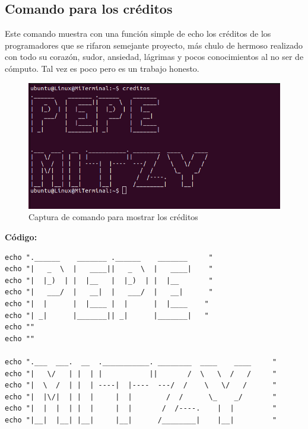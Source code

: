 \documentclass[12pt,a4paper]{article}
\begin{document}
\newpage
\subsection{Comando para los créditos}
\noindent Este comando muestra con una función simple de echo los créditos de los programadores que se rifaron semejante proyecto, más chulo de hermoso realizado con todo su corazón, sudor, ansiedad, lágrimas y pocos conocimientos al no ser de cómputo. Tal vez es poco pero es un trabajo honesto. 

\begin{figure}[H]
    \centering
    \includegraphics[width=\textwidth]{img/cr.png}
    \caption{Captura de comando para mostrar los créditos}
    \label{creditos}
\end{figure}

\textbf{Código:}
\begin{lstlisting}[style=BashInputStyle]
echo ".______    _______ .______    _______     "
echo "|   _  \  |   ____||   _  \  |   ____|    "
echo "|  |_)  | |  |__   |  |_)  | |  |__       "
echo "|   ___/  |   __|  |   ___/  |   __|      "
echo "|  |      |  |____ |  |      |  |____    "
echo "| _|      |_______|| _|      |_______|   "
echo ""
echo ""

echo ".___  ___.  __  .___________. ________  ____    ____     "
echo "|   \/   | |  | |           ||       /  \   \  /   /     "
echo "|  \  /  | |  | ----|  |----  ---/  /    \   \/   /      "
echo "|  |\/|  | |  |     |  |        /  /      \_    _/       "
echo "|  |  |  | |  |     |  |       /  /----.    |  |         "
echo "|__|  |__| |__|     |__|      /________|    |__|         "
\end{lstlisting}

\newpage
\end{document}
